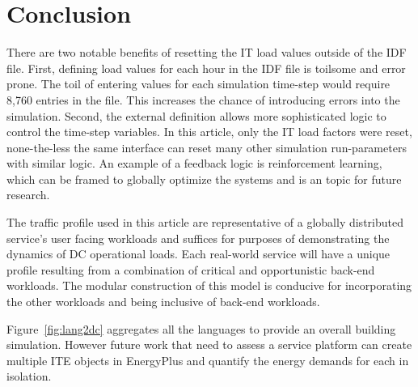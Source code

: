 {%
}

\section*{Conclusion}
There are two notable benefits of resetting the IT load values outside of the IDF file. First, defining load values for each hour in the IDF file is toilsome and error prone. The toil of entering values for each simulation time-step would require 8,760 entries in the file. This increases the chance of introducing errors into the simulation. Second, the external definition allows more sophisticated logic to control the time-step variables. In this article, only the IT load factors were reset, none-the-less the same interface can reset many other simulation run-parameters with similar logic. An example of a feedback logic is reinforcement learning, which can be framed to globally optimize the systems and is an topic for future research. 

The traffic profile used in this article are representative of a globally distributed service’s user facing workloads and suffices for purposes of demonstrating the dynamics of DC operational loads. Each real-world service will have a unique profile resulting from a combination of critical and opportunistic back-end workloads. The modular construction of this model is conducive for incorporating the other workloads and being inclusive of back-end workloads.

Figure~\ref{fig:lang2dc} aggregates all the languages to provide an overall building simulation. However future work that need to assess a service platform can create multiple ITE objects in EnergyPlus and quantify the energy demands for each in isolation.